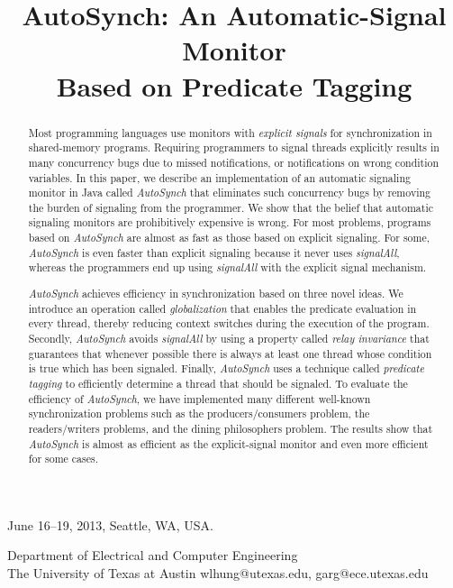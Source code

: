 \documentclass{sigplanconf}
\begin{document}
 {June 16--19, 2013, Seattle, WA, USA.}



\title{AutoSynch: An Automatic-Signal Monitor \\ Based on Predicate Tagging}

           {Department of Electrical and Computer Engineering \\
           The University of Texas at Austin}
           {wlhung@utexas.edu, garg@ece.utexas.edu}

\maketitle
\begin{abstract}
Most programming languages use monitors with {\em explicit signals}
for synchronization in shared-memory programs. Requiring programmers to signal
threads explicitly results in many concurrency bugs due to missed notifications, or
notifications on wrong condition variables.
In this paper, we describe an implementation of an automatic signaling monitor in Java
called {\em AutoSynch} that eliminates such concurrency bugs by 
removing the burden of signaling from the programmer. We show that the
belief that automatic signaling monitors are prohibitively expensive is wrong.
For most problems, programs based on {\em AutoSynch} are almost as fast as 
those based on explicit signaling. For some, {\em AutoSynch} is even faster than
explicit signaling because it never uses {\em signalAll}, whereas the programmers
end up using {\em signalAll} with the explicit signal mechanism.

{\em AutoSynch} achieves efficiency in synchronization based on three novel ideas.
We introduce an operation called
{\em globalization} that enables the predicate evaluation in
every thread, thereby reducing context switches during the execution of the program. 
Secondly, {\em AutoSynch} avoids {\em signalAll} by using a property called {\em relay invariance}
that guarantees that whenever possible there is always at least one thread whose condition is true which has been 
signaled.
Finally, {\em AutoSynch} uses a technique called {\em predicate tagging} to efficiently
determine a thread that should be signaled.
To evaluate the efficiency of {\em AutoSynch}, we have implemented many different 
well-known synchronization problems such as the producers/consumers problem,
the readers/writers problems, and the dining philosophers problem. The results
show that {\em AutoSynch} is almost as efficient as the explicit-signal monitor
and even more efficient for some cases. 

\end{abstract}
\end{document}

